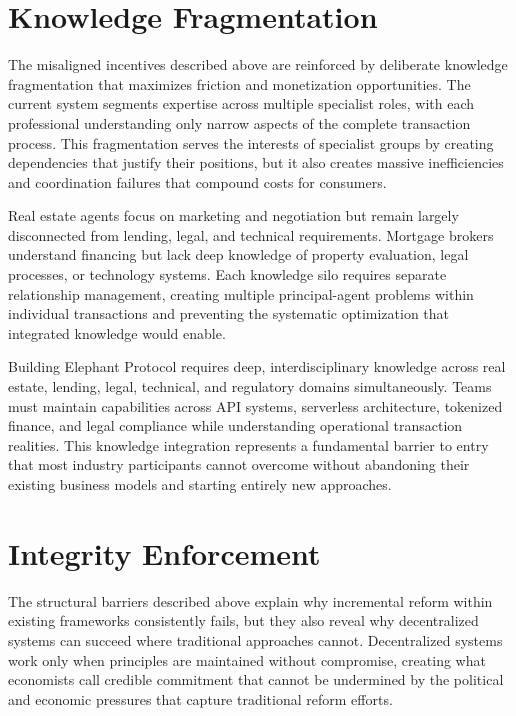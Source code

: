 \section{Knowledge Fragmentation}

The misaligned incentives described above are reinforced by deliberate knowledge fragmentation that maximizes friction and monetization opportunities. The current system segments expertise across multiple specialist roles, with each professional understanding only narrow aspects of the complete transaction process. This fragmentation serves the interests of specialist groups by creating dependencies that justify their positions, but it also creates massive inefficiencies and coordination failures that compound costs for consumers.

Real estate agents focus on marketing and negotiation but remain largely disconnected from lending, legal, and technical requirements. Mortgage brokers understand financing but lack deep knowledge of property evaluation, legal processes, or technology systems. Each knowledge silo requires separate relationship management, creating multiple principal-agent problems within individual transactions and preventing the systematic optimization that integrated knowledge would enable.

Building Elephant Protocol requires deep, interdisciplinary knowledge across real estate, lending, legal, technical, and regulatory domains simultaneously. Teams must maintain capabilities across API systems, serverless architecture, tokenized finance, and legal compliance while understanding operational transaction realities. This knowledge integration represents a fundamental barrier to entry that most industry participants cannot overcome without abandoning their existing business models and starting entirely new approaches.

\section{Integrity Enforcement}

The structural barriers described above explain why incremental reform within existing frameworks consistently fails, but they also reveal why decentralized systems can succeed where traditional approaches cannot. Decentralized systems work only when principles are maintained without compromise, creating what economists call credible commitment that cannot be undermined by the political and economic pressures that capture traditional reform efforts.


